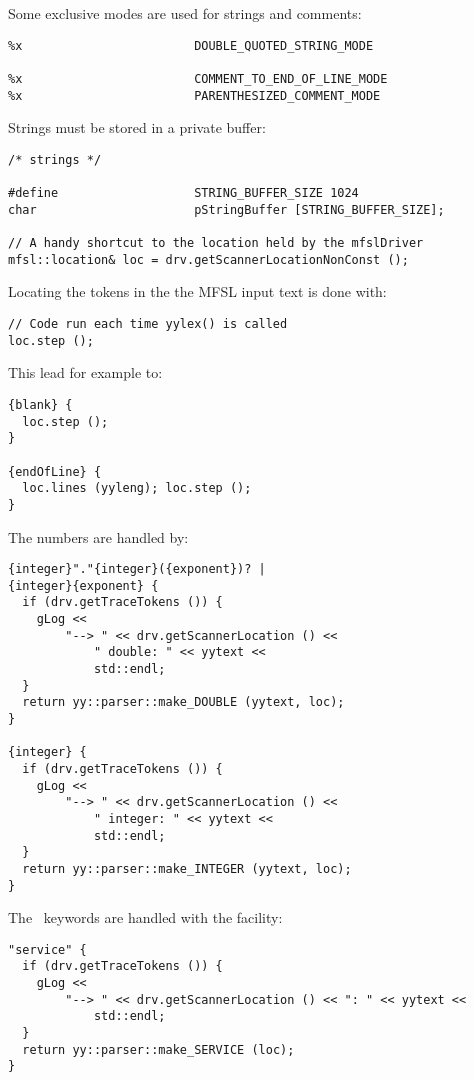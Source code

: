 Some exclusive modes are used for strings and comments:
\begin{lstlisting}[language=Flex]
%x                        SINGLE_QUOTED_STRING_MODE
%x                        DOUBLE_QUOTED_STRING_MODE

%x                        COMMENT_TO_END_OF_LINE_MODE
%x                        PARENTHESIZED_COMMENT_MODE
\end{lstlisting}

Strings must be stored in a private buffer:
\begin{lstlisting}[language=Flex]
/* strings */

#define                   STRING_BUFFER_SIZE 1024
char                      pStringBuffer [STRING_BUFFER_SIZE];

// A handy shortcut to the location held by the mfslDriver
mfsl::location& loc = drv.getScannerLocationNonConst ();
\end{lstlisting}

Locating the tokens in the the MFSL input text is done with:
\begin{lstlisting}[language=Flex]
// Code run each time yylex() is called
loc.step ();
\end{lstlisting}

This lead for example to:
\begin{lstlisting}[language=Flex]
{blank} {
  loc.step ();
}

{endOfLine} {
  loc.lines (yyleng); loc.step ();
}
\end{lstlisting}

The numbers are handled by:
\begin{lstlisting}[language=Flex]
{integer}"."{integer}({exponent})? |
{integer}{exponent} {
  if (drv.getTraceTokens ()) {
    gLog <<
    	"--> " << drv.getScannerLocation () <<
			" double: " << yytext <<
			std::endl;
  }
  return yy::parser::make_DOUBLE (yytext, loc);
}

{integer} {
  if (drv.getTraceTokens ()) {
    gLog <<
    	"--> " << drv.getScannerLocation () <<
			" integer: " << yytext <<
			std::endl;
  }
  return yy::parser::make_INTEGER (yytext, loc);
}
\end{lstlisting}

The \mfslLang\ keywords are handled with the  facility:
\begin{lstlisting}[language=Flex]
"service" {
  if (drv.getTraceTokens ()) {
    gLog <<
    	"--> " << drv.getScannerLocation () << ": " << yytext <<
			std::endl;
  }
  return yy::parser::make_SERVICE (loc);
}
\end{lstlisting}


